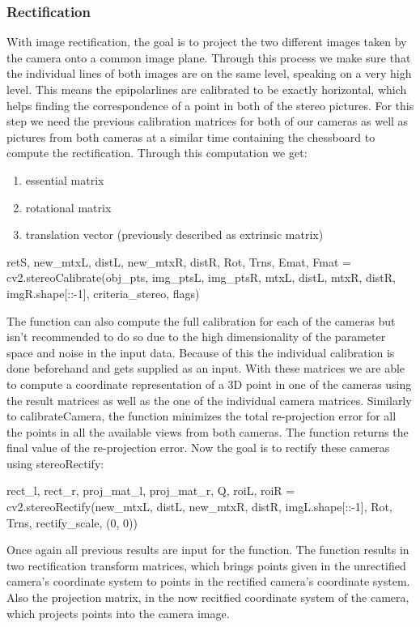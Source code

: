 \documentclass[journal,onecolumn]{IEEEtran}
\begin{document}
\subsubsection{Rectification}
\noindent
With image rectification, the goal is to project the two different images taken by the camera onto a common image plane. Through this process we make sure that the individual lines of both images are on the same level, speaking on a very high level. This means the epipolarlines are calibrated to be exactly horizontal, which helps finding the correspondence of a point in both of the stereo pictures.
For this step we need the previous calibration matrices for both of our cameras as well as pictures from both cameras at a similar time containing the chessboard to compute the rectification. Through this computation we get:
\begin{enumerate}
	\item essential matrix
	\item rotational matrix
	\item translation vector (previously described as extrinsic matrix)
\end{enumerate}

\begin{python}
retS, new_mtxL, distL, new_mtxR, distR, Rot, Trns, Emat, Fmat = cv2.stereoCalibrate(obj_pts,
									img_ptsL,
									img_ptsR,
									mtxL,
									distL,
									mtxR,
									distR,
									imgR.shape[::-1],
									criteria_stereo,
									flags)
\end{python}
The function can also compute the full calibration for each of the cameras but isn't recommended to do so due to the high dimensionality of the parameter space and noise in the input data\cite{stereoCalibrate}. Because of this the individual calibration is done beforehand and gets supplied as an input.
With these matrices we are able to compute a coordinate representation of a 3D point in one of the cameras using the result matrices as well as the one of the individual camera matrices.
Similarly to calibrateCamera, the function minimizes the total re-projection error for all the points in all the available views from both cameras. The function returns the final value of the re-projection error.
Now the goal is to rectify these cameras using stereoRectify:
\begin{python}
rect_l, rect_r, proj_mat_l, proj_mat_r, Q, roiL, roiR = cv2.stereoRectify(new_mtxL,
										distL,
										new_mtxR,
										distR,
										imgL.shape[::-1],
										Rot,
										Trns,
										rectify_scale, (0, 0))
\end{python}
Once again all previous results are input for the function. The function results in two rectification transform matrices, which brings points given in the unrectified camera's coordinate system to points in the rectified camera's coordinate system. Also the projection matrix, in the now recitfied coordinate system of the camera, which projects points into the camera image.
\end{document}
